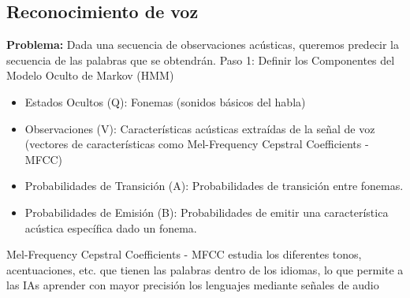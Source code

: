 \documentclass[11pt,openany]{book}
\begin{document}
\subsection*{Reconocimiento de voz}

\textbf{Problema:} Dada una secuencia de observaciones acústicas, queremos predecir la secuencia de las palabras que se obtendrán.
Paso 1: Definir los Componentes del Modelo Oculto de Markov (HMM)
      \begin{itemize}
            \item  Estados Ocultos (Q): Fonemas (sonidos básicos del habla)
            \item  Observaciones (V): Características acústicas extraídas de la señal de voz (vectores de características como Mel-Frequency Cepstral Coefficients - MFCC)
            \item  Probabilidades de Transición (A): Probabilidades de transición entre fonemas.
            \item  Probabilidades de Emisión (B): Probabilidades de emitir una característica acústica específica dado un fonema.
      \end{itemize}
   
    Mel-Frequency Cepstral Coefficients - MFCC estudia los diferentes tonos, acentuaciones, etc. que tienen las palabras dentro de los idiomas, lo que permite a las IAs aprender
    con mayor precisión los lenguajes mediante señales de audio
\end{document}
